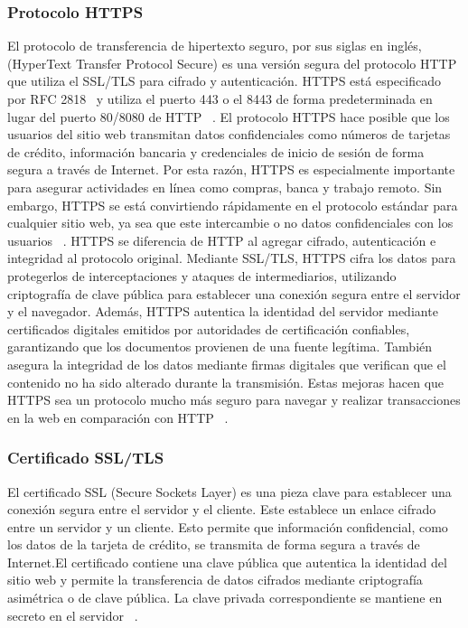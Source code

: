\subsubsection{Protocolo HTTPS}
El protocolo de transferencia de hipertexto seguro, por sus siglas en inglés, (HyperText Transfer Protocol Secure) es una versión segura del protocolo HTTP que utiliza el SSL\slash TLS para cifrado y autenticación. HTTPS está especificado por RFC 2818~\cite{RFC2818} y utiliza el puerto 443 o el 8443 de forma predeterminada en lugar del puerto 80/8080 de HTTP ~\cite{HTTPS-SSL}. \newline
El protocolo HTTPS hace posible que los usuarios del sitio web transmitan datos confidenciales como números de tarjetas de crédito, información bancaria y credenciales de inicio de sesión de forma segura a través de Internet. Por esta razón, HTTPS es especialmente importante para asegurar actividades en línea como compras, banca y trabajo remoto. Sin embargo, HTTPS se está convirtiendo rápidamente en el protocolo estándar para cualquier sitio web, ya sea que este intercambie o no datos confidenciales con los usuarios ~\cite{HTTPS-SSL}.\newline
HTTPS se diferencia de HTTP al agregar cifrado, autenticación e integridad al protocolo original. Mediante SSL/TLS, HTTPS cifra los datos para protegerlos de interceptaciones y ataques de intermediarios, utilizando criptografía de clave pública para establecer una conexión segura entre el servidor y el navegador. Además, HTTPS autentica la identidad del servidor mediante certificados digitales emitidos por autoridades de certificación confiables, garantizando que los documentos provienen de una fuente legítima. También asegura la integridad de los datos mediante firmas digitales que verifican que el contenido no ha sido alterado durante la transmisión. Estas mejoras hacen que HTTPS sea un protocolo mucho más seguro para navegar y realizar transacciones en la web en comparación con HTTP ~\cite{HTTPS-SSL}.

\subsubsection{Certificado SSL/TLS}
El certificado SSL (Secure Sockets Layer) es una pieza clave para establecer una conexión segura entre el servidor y el cliente. Este establece un enlace cifrado entre un servidor y un cliente. Esto permite que información confidencial, como los datos de la tarjeta de crédito, se transmita de forma segura a través de Internet.El certificado contiene una clave pública que autentica la identidad del sitio web y permite la transferencia de datos cifrados mediante criptografía asimétrica o de clave pública. La clave privada correspondiente se mantiene en secreto en el servidor ~\cite{SSL-TLS}.


